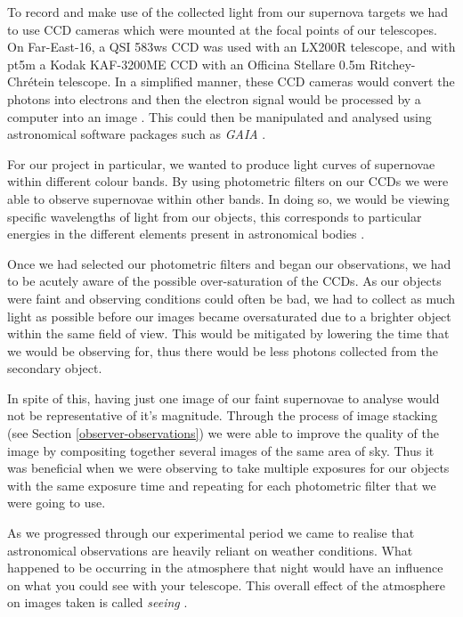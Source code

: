 \documentclass[twocolumn]{revtex4}
\begin{document}
To record and make use of the collected light from our supernova targets we had to use CCD cameras which were mounted at the focal points of our telescopes. On Far-East-16, a QSI 583ws CCD was used with an LX200R telescope, and with pt5m a Kodak KAF-3200ME CCD with an Officina Stellare 0.5m Ritchey-Chr\'{e}tein telescope. In a simplified manner, these CCD cameras would convert the photons into electrons and then the electron signal would be processed by a computer into an image \cite{mod_ast, tel_tech}. This could then be manipulated and analysed using astronomical software packages such as \textit{GAIA} \cite{starlink}.

For our project in particular, we wanted to produce light curves of supernovae within different colour bands. By using photometric filters on our CCDs we were able to observe supernovae within other bands. In doing so, we would be viewing specific wavelengths of light from our objects, this corresponds to particular energies in the different elements present in astronomical bodies \cite{astro_filters}. 

Once we had selected our photometric filters and began our observations, we had to be acutely aware of the possible over-saturation of the CCDs. As our objects were faint and observing conditions could often be bad, we had to collect as much light as possible before our images became oversaturated due to a brighter object within the same field of view. This would be mitigated by lowering the time that we would be observing for, thus there would be less photons collected from the secondary object.

In spite of this, having just one image of our faint supernovae to analyse would not be representative of it's magnitude. Through the process of image stacking (see Section \ref{observer-observations}) we were able to improve the quality of the image by compositing together several images of the same area of sky. Thus it was beneficial when we were observing to take multiple exposures for our objects with the same exposure time and repeating for each photometric filter that we were going to use. 

As we progressed through our experimental period we came to realise that astronomical observations are heavily reliant on weather conditions. What happened to be occurring in the atmosphere that night would have an influence on what you could see with your telescope. This overall effect of the atmosphere on images taken is called \textit{seeing} \cite{tel_tech}.
\end{document}
